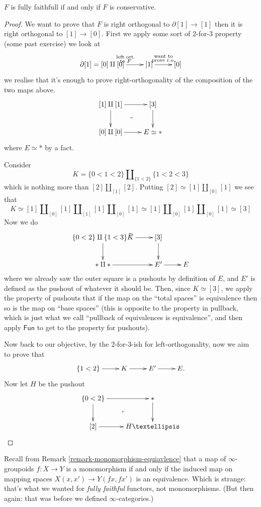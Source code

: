 \begin{theorem}
\label{theorem-fully-faithful-implies-conservative}
$F$ is fully faithfull if and only if
$F$ is conservative.
\end{theorem}

\begin{proof}
We want to prove that $F$ 
is right orthogonal to $\partial[1]\to [1]$
then it is right orthogonal to $[1]\to [0]$.
First we apply some sort of 2-for-3
property (some past exercise)
we look at
$$
\xymatrix{
\partial[1]=[0]\amalg[0]\ar[r]^{\substack{\text{left ort.} \\ \text{to $F$}}}
& [1]\ar[r]^{\substack{\text{want to} \\ \text{prove r.o.}}}
&[0]
}
$$
we realise that it's enough
to prove right-orthogonality of the
composition of the two maps above.
$$
\xymatrix{
[1]\amalg[1]\ar[r]\ar[d]\ar@{}[dr]|-{\ulcorner}&[3]\ar[d]\\
[0]\amalg[0]\ar[r]&E\simeq *
}
$$
where $E \simeq *$ by a fact.

Consider
$$
K=\{0<1<2\}\amalg_{\{1<2\}}\{1<2<3\}
$$
which is nothing more than $[2]\amalg_{[1]}[2]$.
Putting $[2]\simeq[1]\amalg_{[0]}[1]$ 
we see that
$$
K\simeq[1]\amalg_{[0]}[1]\amalg_{[1]}[1]\amalg_{[0]}[1]
\simeq[1]\amalg_{[0]}[1]\amalg_{[0]}[1]\simeq[3]
$$
Now we do
$$
\xymatrix{
\{0<2\}\amalg\{1<3\}K\ar[r]^{\simeq}\ar[d]&[3]\ar[d]\\
\ast \amalg \ast\ar[r]&E' \ar[r]&E
}
$$
where we already saw the outer square is
a pushouts by definition of $E$,
and $E'$ is defined as the pushout of
whatever it should be.
Then, since $K \simeq [3]$,
we apply the property of pushouts
that if the map on the ``total spaces''
is equivalence then so is the
map on ``base spaces''
(this is opposite to the property in pullback,
which is just what we call
``pullback of equivalences is equivalence'',
and then apply $\mathsf{Fun}$ 
to get to the property for pushouts).

Now back to our objective,
by the 2-for-3-ish for left-orthogonality,
now we aim to prove that
$$
\xymatrix{
\{1<2\}\ar[r]& K\ar[r]&E'\ar[r]&E.
}
$$
Now let $H$ be the pushout
$$
\xymatrix{
\{0<2\} \ar[r]\ar[d]\ar@{}[dr]|-{\ulcorner}& \ast \ar[d]\\
[2] \ar[r]& H…
}
$$
\end{proof}

Recall from Remark \ref{remark-monomorphism-equiavlence}
that a map of $\infty$-groupoids $f:X \to Y$
is a monomorphism if and only if 
the induced map on mapping spaces
$X(x,x') \to Y(fx,fx')$ is an equivalence.
Which is strange: that's what we wanted for
{\it fully faithful} functors, not monomorphisms.
(But then again: that was before we defined
$\infty$-categories.)

